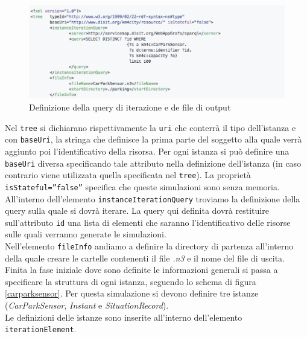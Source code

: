 \documentclass[12pt,a4paper,italian]{article}
\begin{document}
\begin{figure}[h!]
	\centering
	\includegraphics[width=14cm]{img/esempio_p1.png}
	\caption{Definizione della query di iterazione e de file di output}\label{esempio1}
\end{figure}
Nel \texttt{tree} si dichiarano rispettivamente la \texttt{uri} che conterrà il tipo dell'istanza e con \texttt{baseUri}, la stringa che definisce la prima parte del soggetto alla quale verrà aggiunto poi l'identificativo della risorsa. Per ogni istanza si può definire una \texttt{baseUri} diversa specificando tale attributo nella definizione dell'istanza (in caso contrario viene utilizzata quella specificata nel \texttt{tree}).
La proprietà \texttt{isStateful=''false''} specifica che queste simulazioni sono senza memoria.\\
\newline
All'interno dell'elemento \texttt{instanceIterationQuery} troviamo la definizione della query sulla quale si dovrà iterare. La query qui definita dovrà restituire sull'attributo \texttt{id} una lista di elementi che saranno l'identificativo delle risorse sulle quali verranno generate le simulazioni.\\
Nell'elemento \texttt{fileInfo} andiamo a definire la directory di partenza all'interno della quale creare le cartelle contenenti il file \emph{.n3} e il nome del file di uscita.\\
Finita la fase iniziale dove sono definite le informazioni generali si passa a specificare la struttura di ogni istanza, seguendo lo schema di figura \ref{carparksensor}. Per questa simulazione si devono definire tre istanze (\emph{CarParkSensor}, \emph{Instant} e \emph{SituationRecord}).\\
Le definizioni delle istanze sono inserite all'interno dell'elemento\\ \texttt{iterationElement}.\\
\end{document}
